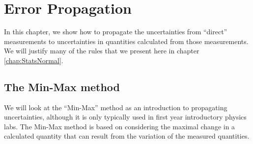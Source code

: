 %
\chapter{Error Propagation}
\label{chap:ErrorPropagation}
In this chapter, we show how to propagate the uncertainties from ``direct'' measurements to uncertainties in quantities calculated from those measurements. We will justify many of the rules that we present here in chapter \ref{chap:StatsNormal}.

\section{The Min-Max method}
We will look at the ``Min-Max'' method as an introduction to propagating uncertainties, although it is only typically used in first year introductory physics labs. The Min-Max method is based on considering the maximal change in a calculated quantity that can result from the variation of the measured quantities.

